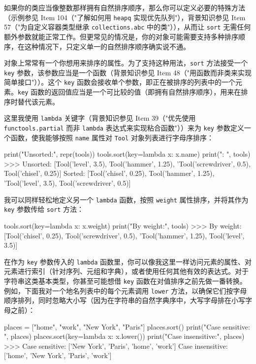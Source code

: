 如果你的类应当像整数那样拥有自然排序顺序，那么你可以定义必要的特殊方法（示例参见 Item 104（"了解如何用 \texttt{heapq} 实现优先队列"），背景知识参见 Item 57（"为自定义容器类型继承 \texttt{collections.abc} 中的类"）），从而让 \texttt{sort} 无需任何额外参数就能正常工作。但更常见的情况是，你的对象可能需要支持多种排序顺序，在这种情况下，只定义单一的自然排序顺序确实说不通。

对象上常常有一个你想用来排序的属性。为了支持这种用法，\texttt{sort} 方法接受一个 \texttt{key} 参数，该参数应当是一个函数（背景知识参见 Item 48（"用函数而非类来实现简单接口"））。这个 \texttt{key} 函数会接收单个参数，即正在被排序的列表中的一个元素。\texttt{key} 函数的返回值应当是一个可比较的值（即拥有自然排序顺序），用来在排序时替代该元素。

这里我使用 \texttt{lambda} 关键字（背景知识参见 Item 39（"优先使用 \texttt{functools.partial} 而非 \texttt{lambda} 表达式来实现粘合函数"））来为 \texttt{key} 参数定义一个函数，使我能够按照 \texttt{name} 属性对 \texttt{Tool} 对象列表进行字母序排序：

\begin{codebox}[python]
print("Unsorted:", repr(tools))
tools.sort(key=lambda x: x.name)
print("\nSorted:  ", tools)
>>>
Unsorted: [Tool('level', 3.5), Tool('hammer', 1.25),
'Tool('screwdriver', 0.5), Tool('chisel', 0.25)]
Sorted:   [Tool('chisel', 0.25), Tool('hammer', 1.25),
'Tool('level', 3.5), Tool('screwdriver', 0.5)]
\end{codebox}

我可以同样轻松地定义另一个 \texttt{lambda} 函数，按照 \texttt{weight} 属性排序，并将其作为 \texttt{key} 参数传给 \texttt{sort} 方法：

\begin{codebox}[python]
tools.sort(key=lambda x: x.weight)
print("By weight:", tools)
>>>
By weight: [Tool('chisel', 0.25), Tool('screwdriver', 0.5),
'Tool('hammer', 1.25), Tool('level', 3.5)]
\end{codebox}

在作为 \texttt{key} 参数传入的 \texttt{lambda} 函数里，你可以像我这里一样访问元素的属性、对元素进行索引（针对序列、元组和字典），或者使用任何其他有效的表达式。对于字符串这类基本类型，你甚至可能想借 \texttt{key} 函数在对值排序之前先做一番转换。例如，下面我对一个地名列表中的每个元素调用 \texttt{lower} 方法，以确保它们按字母顺序排列，同时忽略大小写（因为在字符串的自然字典序中，大写字母排在小写字母之前）：

\begin{codebox}[python]
places = ["home", "work", "New York", "Paris"]
places.sort()
print("Case sensitive:  ", places)
places.sort(key=lambda x: x.lower())
print("Case insensitive:", places)
>>>
Case sensitive:   ['New York', 'Paris', 'home', 'work']
Case insensitive: ['home', 'New York', 'Paris', 'work']
\end{codebox}


